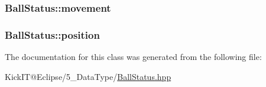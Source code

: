 \subsubsection[{\texorpdfstring{movement}{movement}}]{ Ball\+Status\+::movement}\hypertarget{class_ball_status_a8dce8cc463cb99e8bc8a02d8dd880e21}{}\label{class_ball_status_a8dce8cc463cb99e8bc8a02d8dd880e21}
\subsubsection[{\texorpdfstring{position}{position}}]{ Ball\+Status\+::position}\hypertarget{class_ball_status_a7d841e95314cf93e4afbc894288a992b}{}\label{class_ball_status_a7d841e95314cf93e4afbc894288a992b}


The documentation for this class was generated from the following file\+:\begin{DoxyCompactItemize}
\item 
Kick\+I\+T@\+Eclipse/5\+\_\+\+Data\+Type/\hyperlink{_ball_status_8hpp}{Ball\+Status.\+hpp}\end{DoxyCompactItemize}
